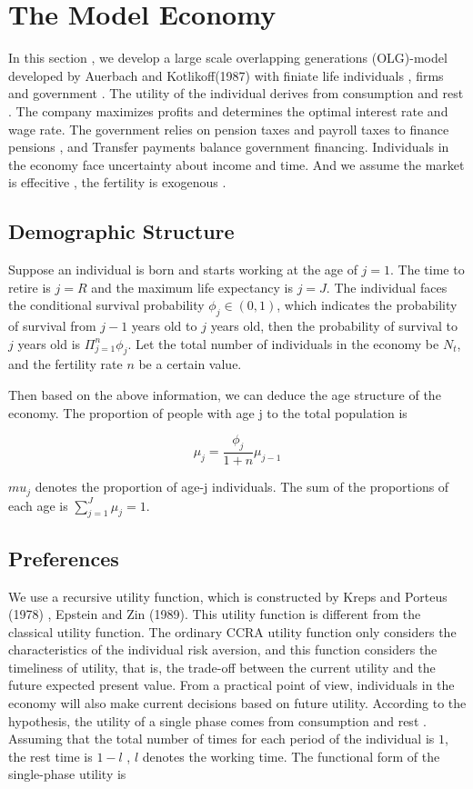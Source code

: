 \documentclass{article}
\begin{document}
\section{The Model Economy}

        In this section , we develop a large scale overlapping generations (OLG)-model developed by Auerbach and Kotlikoff(1987) with finiate life individuals ,
    firms and government . The utility of the individual derives from consumption and rest . The company maximizes profits and determines the optimal interest rate and wage rate.
    The government relies on pension taxes and payroll taxes to finance pensions , and Transfer payments balance government financing. 
    Individuals in the economy face uncertainty about income and time.
    And we assume the market is effecitive , the fertility is exogenous .
    \subsection{Demographic Structure}

            Suppose an individual is born and starts working at the age of $j=1$. The time to retire is $j=R$ and the maximum life expectancy is $j=J$.
        The individual faces the conditional survival probability $\phi_j\in(0,1)$, which indicates the 
        probability of survival from $j-1$ years old to $j$ years old, then the probability of survival to $j$ years old is $\Pi_{j=1}^{n}\phi_j$. Let the total number of individuals 
        in the economy be $N_t$, and the fertility rate $n$ be a certain value.

            Then based on the above information, we can deduce the age structure of the economy.
        The proportion of people with age j to the total population is 

        \begin{equation}
            \mu_j=\frac{\phi_j}{1+n} \mu_{j-1}
        \end{equation}

        $mu_j$ denotes the proportion of age-j individuals. The sum of the proportions of each age is $\sum_{j=1}^{J}\mu_j=1$.
    \subsection{Preferences}

            We use a recursive utility function, which is constructed by Kreps and Porteus (1978) , Epstein and Zin (1989).
        This utility function is different from the classical utility function. The ordinary CCRA utility function only 
        considers the characteristics of the individual risk aversion, and this function considers the timeliness of utility, that is, the trade-off between the current utility and the future expected present value. 
        From a practical point of view, individuals in the economy will also make current decisions based on future utility.
        According to the hypothesis, the utility of a single phase comes from consumption and rest . 
        Assuming that the total number of times for each period of the individual is $1$, the rest time is $1-l$ , $l$ denotes 
        the working time. The functional form of the single-phase utility is 
\end{document}
